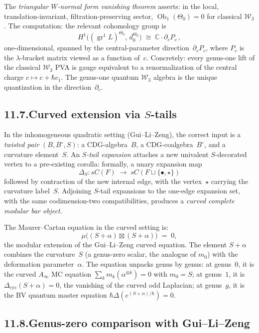 \documentclass[11pt]{report}
\theoremstyle{definition}
\theoremstyle{remark}
\numberwithin{equation}{section}
\begin{document}
The \emph{triangular $W$-normal form vanishing theorem} asserts:
in the local, translation-invariant, filtration-preserving sector,
$\operatorname{Ob}_1(\Theta_0)=0$ for classical $\mathcal W_3$.
The computation: the relevant cohomology group is
\[
H^1\!\bigl((\operatorname{gr}^1 L)^{\Theta_0},\,d_0^{\Theta_0}\bigr)
\;\cong\;\mathbb C\cdot\partial_c P_c\,,
\]
one-dimensional, spanned by the central-parameter
direction~$\partial_c P_c$, where $P_c$ is the $\lambda$-bracket
matrix viewed as a function of~$c$. Concretely: every genus-one
lift of the classical $\mathcal W_3$ PVA is gauge equivalent to a
renormalization of the central charge $c\mapsto c+\hbar c_1$.
The genus-one quantum $\mathcal W_3$ algebra is the unique quantization
in the direction~$\partial_c$.

\subsection*{11.7.\enspace Curved extension via $S$-tails}

In the inhomogeneous quadratic setting (Gui--Li--Zeng), the correct
input is a \emph{twisted pair} $(B,B^\circ,S)$: a CDG-algebra~$B$,
a CDG-coalgebra~$B^\circ$, and a curvature element~$S$.
An \emph{$S$-tail expansion} attaches a new univalent
$S$-decorated vertex to a pre-existing corolla: formally, a
unary expansion map
\[
\Delta_S\colon sC(F)\;\longrightarrow\;sC(F\sqcup\{\bullet,\star\})
\]
followed by contraction of the new internal edge, with the
vertex~$\star$ carrying the curvature label~$S$. Adjoining
$S$-tail expansions to the one-edge expansion set, with the
same codimension-two compatibilities, produces a \emph{curved
complete modular bar object}.

The Maurer--Cartan equation in the curved setting is:
\[
\mu\!\bigl((S+\alpha)\boxtimes(S+\alpha)\bigr)\;=\;0,
\]
the modular extension of the Gui--Li--Zeng curved equation.
The element $S+\alpha$ combines the curvature~$S$ (a genus-zero
scalar, the analogue of $m_0$) with the deformation
parameter~$\alpha$. The equation unpacks genus by genus: at
genus~$0$, it is the curved $A_\infty$ MC equation
$\sum_k m_k(\alpha^{\otimes k})=0$ with $m_0=S$; at genus~$1$,
it is $\Delta_{\mathrm{cyc}}(S+\alpha)=0$, the vanishing of the
curved odd Laplacian; at genus~$g$, it is the BV quantum master
equation $\hbar\Delta(e^{(S+\alpha)/\hbar})=0$.

\subsection*{11.8.\enspace Genus-zero comparison with Gui--Li--Zeng}
\end{document}
